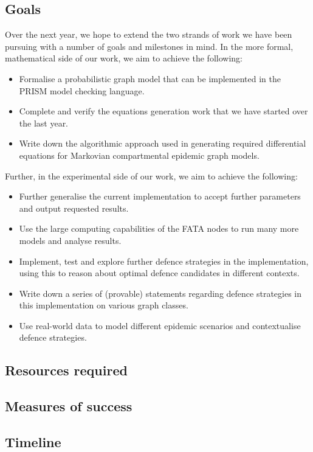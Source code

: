\documentclass[../report.tex]{subfiles}
\begin{document}
\subsection{Goals}

Over the next year, we hope to extend the two strands of work we have been pursuing with a number of goals and milestones in mind. In the more formal, mathematical side of our work, we aim to achieve the following:
\begin{itemize}
	\item Formalise a probabilistic graph model that can be implemented in the PRISM model checking language.
	\item Complete and verify the equations generation work that we have started over the last year. 
	\item Write down the algorithmic approach used in generating required differential equations for Markovian compartmental epidemic graph models.
\end{itemize}

Further, in the experimental side of our work, we aim to achieve the following:
\begin{itemize}
	\item Further generalise the current implementation to accept further parameters and output requested results.
	\item Use the large computing capabilities of the FATA nodes to run many more models and analyse results.
	\item Implement, test and explore further defence strategies in the implementation, using this to reason about optimal defence candidates in different contexts.
	\item Write down a series of (provable) statements regarding defence strategies in this implementation on various graph classes.
	\item Use real-world data to model different epidemic scenarios and contextualise defence strategies.
\end{itemize}


\subsection{Resources required}

\subsection{Measures of success}

\subsection{Timeline}
\end{document}
